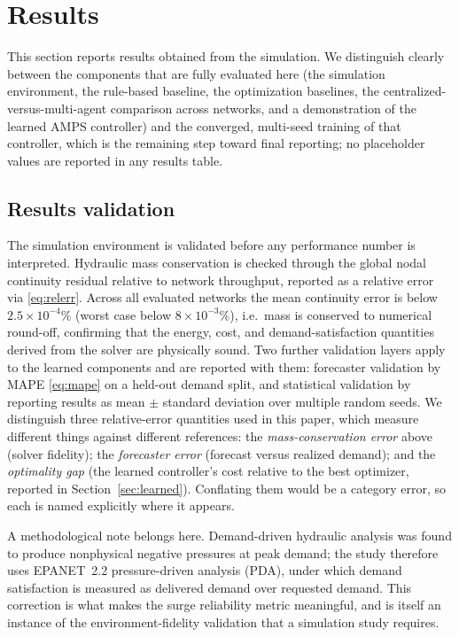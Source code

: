 \documentclass[11pt,a4paper]{article}
\begin{document}
\section{Results}
\label{sec:results}

\noindent This section reports results obtained from the simulation. We
distinguish clearly between the components that are fully evaluated here
(the simulation environment, the rule-based baseline, the optimization
baselines, the centralized-versus-multi-agent comparison across networks, and a
demonstration of the learned AMPS controller) and the converged, multi-seed
training of that controller, which is the remaining step toward final reporting;
no placeholder values are reported in any results table.

\subsection{Results validation}
\label{sec:validation}
The simulation environment is validated before any performance number is
interpreted. Hydraulic mass conservation is checked through the global nodal
continuity residual relative to network throughput, reported as a relative error
via \eqref{eq:relerr}. Across all evaluated networks the mean continuity error is
below $2.5\times10^{-4}\%$ (worst case below $8\times10^{-3}\%$), i.e.\ mass is
conserved to numerical round-off, confirming that the energy, cost, and
demand-satisfaction quantities derived from the solver are physically sound.
Two further validation layers apply to the learned components and are reported
with them: forecaster validation by MAPE \eqref{eq:mape} on a held-out demand
split, and statistical validation by reporting results as mean $\pm$ standard
deviation over multiple random seeds. We distinguish three relative-error
quantities used in this paper, which measure different things against different
references: the \emph{mass-conservation error} above (solver fidelity); the
\emph{forecaster error} (forecast versus realized demand); and the
\emph{optimality gap} (the learned controller's cost relative to the best
optimizer, reported in Section~\ref{sec:learned}). Conflating them would be a
category error, so each is named explicitly where it appears.

A methodological note belongs here. Demand-driven hydraulic analysis was found to
produce nonphysical negative pressures at peak demand; the study therefore uses
EPANET~2.2 pressure-driven analysis (PDA), under which demand satisfaction is
measured as delivered demand over requested demand. This correction is what makes
the surge reliability metric meaningful, and is itself an instance of the
environment-fidelity validation that a simulation study requires.
\end{document}
